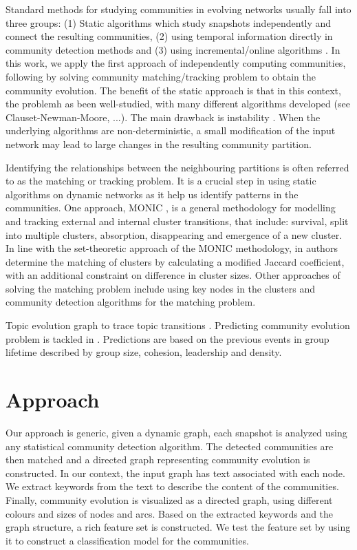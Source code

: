\documentclass{article} %
\begin{document}
Standard methods for studying communities in evolving networks usually fall into three groups: (1) Static algorithms which study snapshots independently  and connect the resulting communities, (2) using temporal information directly in community detection methods and (3) using incremental/online algorithms \cite{aynaud}. In this work, we apply the first approach of independently computing communities, following by solving community matching/tracking problem to obtain the community evolution. The benefit of  the static approach is that in this context, the problemh as been  well-studied, with many different algorithms developed (see Clauset-Newman-Moore\cite{clauset-newman-moore}, ...). The main drawback is  instability \cite{aynaud2010}. When the underlying algorithms are  non-deterministic, a small modification of the input network may lead to large changes in the resulting community partition.
 
Identifying the relationships between the neighbouring partitions is often referred to as the matching or tracking problem. It is a crucial step in using static algorithms on dynamic networks as it help us identify patterns in the communities. One approach, 
MONIC \cite{spiliopoulou}, is a general methodology for modelling and tracking external and internal cluster transitions, that include: survival, split into multiple clusters, absorption, disappearing and emergence of a new cluster. In line with the set-theoretic approach of  the MONIC methodology, in \cite{gliwa2013} authors determine the  matching of clusters by calculating a modified Jaccard coefficient, with an additional constraint on difference in cluster sizes. Other approaches of solving the matching problem include using key nodes in the clusters \cite{wang} and community detection algorithms for the matching problem\cite{palla}.

Topic evolution graph to trace topic transitions \cite{mei2005}.
Predicting community evolution problem is tackled in \cite{gliwa2013}. Predictions are based on the previous events in group lifetime described by group size, cohesion, leadership and density.

\section{Approach}
Our approach is generic,  given a dynamic graph, each snapshot is analyzed using any statistical community detection algorithm. The detected communities are then matched and a directed graph representing community evolution is constructed. In our context, the input graph has text associated with each node. We extract keywords from the text 
 to describe the content of the communities. Finally, community evolution is visualized as a directed graph, using different colours and sizes of nodes and arcs.  Based on the extracted keywords and the graph structure, a rich feature set is constructed. We test the feature set by using it to construct a classification model for the communities.  
\end{document}
